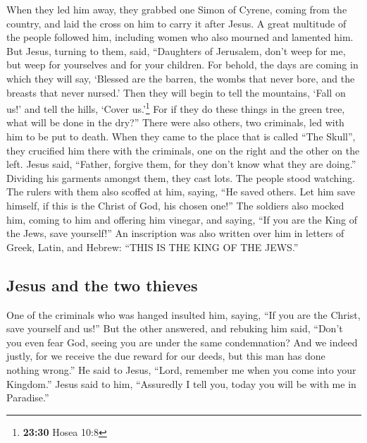  When they led him away, they grabbed one Simon of
Cyrene, coming from the country, and laid the cross on him to carry it
after Jesus.  A great multitude of the people followed
him, including women who also mourned and lamented him. 
But Jesus, turning to them, said, ``Daughters of Jerusalem, don't weep
for me, but weep for yourselves and for your children. 
For behold, the days are coming in which they will say, `Blessed are the
barren, the wombs that never bore, and the breasts that never nursed.'
 Then they will begin to tell the mountains, `Fall on
us!' and tell the hills, `Cover us.'\footnote{\textbf{23:30} Hosea 10:8}
 For if they do these things in the green tree, what will
be done in the dry?''  There were also others, two
criminals, led with him to be put to death.  When they
came to the place that is called ``The Skull'', they crucified him there
with the criminals, one on the right and the other on the left.
 Jesus said, ``Father, forgive them, for they don't know
what they are doing.'' Dividing his garments amongst them, they cast
lots.  The people stood watching. The rulers with them
also scoffed at him, saying, ``He saved others. Let him save himself, if
this is the Christ of God, his chosen one!''  The
soldiers also mocked him, coming to him and offering him vinegar,
 and saying, ``If you are the King of the Jews, save
yourself!''  An inscription was also written over him in
letters of Greek, Latin, and Hebrew: ``THIS IS THE KING OF THE JEWS.''

\hypertarget{jesus-and-the-two-thieves}{%
\subsection{Jesus and the two thieves}\label{jesus-and-the-two-thieves}}

 One of the criminals who was hanged insulted him,
saying, ``If you are the Christ, save yourself and us!'' 
But the other answered, and rebuking him said, ``Don't you even fear
God, seeing you are under the same condemnation?  And we
indeed justly, for we receive the due reward for our deeds, but this man
has done nothing wrong.''  He said to Jesus, ``Lord,
remember me when you come into your Kingdom.''  Jesus
said to him, ``Assuredly I tell you, today you will be with me in
Paradise.''


